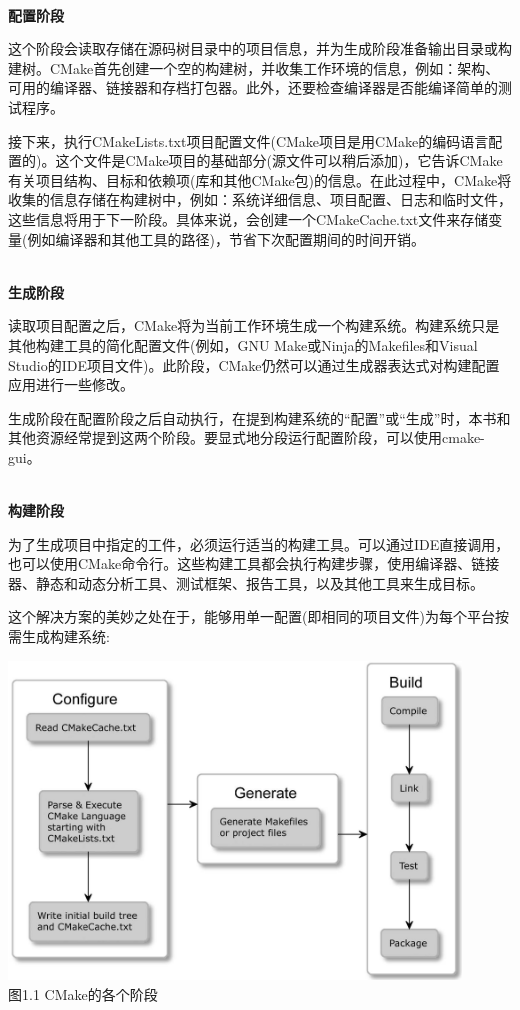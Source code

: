\hspace*{\fill} \\ %
\noindent
\textbf{配置阶段}

这个阶段会读取存储在源码树目录中的项目信息，并为生成阶段准备输出目录或构建树。CMake首先创建一个空的构建树，并收集工作环境的信息，例如：架构、可用的编译器、链接器和存档打包器。此外，还要检查编译器是否能编译简单的测试程序。

接下来，执行CMakeLists.txt项目配置文件(CMake项目是用CMake的编码语言配置的)。这个文件是CMake项目的基础部分(源文件可以稍后添加)，它告诉CMake有关项目结构、目标和依赖项(库和其他CMake包)的信息。在此过程中，CMake将收集的信息存储在构建树中，例如：系统详细信息、项目配置、日志和临时文件，这些信息将用于下一阶段。具体来说，会创建一个CMakeCache.txt文件来存储变量(例如编译器和其他工具的路径)，节省下次配置期间的时间开销。

\hspace*{\fill} \\ %
\noindent
\textbf{生成阶段}

读取项目配置之后，CMake将为当前工作环境生成一个构建系统。构建系统只是其他构建工具的简化配置文件(例如，GNU Make或Ninja的Makefiles和Visual Studio的IDE项目文件)。此阶段，CMake仍然可以通过生成器表达式对构建配置应用进行一些修改。

\begin{tcolorbox}[colback=blue!5!white,colframe=blue!75!black,title=Note]
生成阶段在配置阶段之后自动执行，在提到构建系统的“配置”或“生成”时，本书和其他资源经常提到这两个阶段。要显式地分段运行配置阶段，可以使用cmake-gui。
\end{tcolorbox}

\hspace*{\fill} \\ %
\noindent
\textbf{构建阶段}

为了生成项目中指定的工件，必须运行适当的构建工具。可以通过IDE直接调用，也可以使用CMake命令行。这些构建工具都会执行构建步骤，使用编译器、链接器、静态和动态分析工具、测试框架、报告工具，以及其他工具来生成目标。

这个解决方案的美妙之处在于，能够用单一配置(即相同的项目文件)为每个平台按需生成构建系统:

\begin{center}
\includegraphics[width=0.9\textwidth]{content/1/chapter1/images/1.jpg}\\
图1.1  CMake的各个阶段
\end{center}

